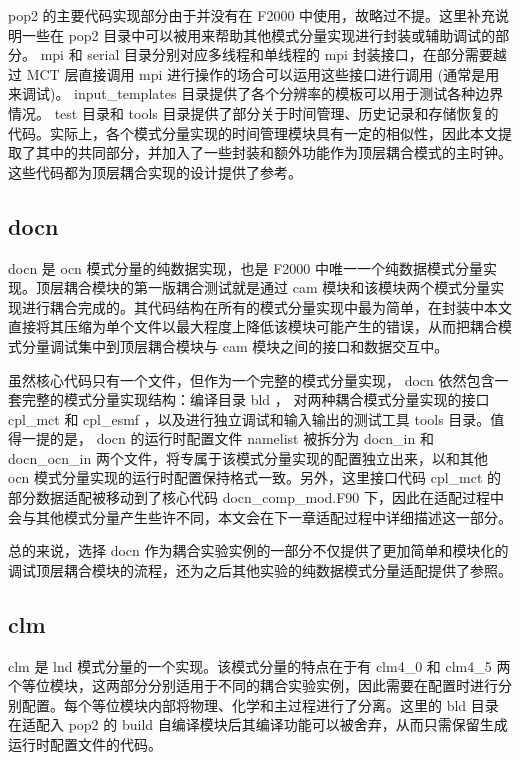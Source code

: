 pop2 的主要代码实现部分由于并没有在 F2000 中使用，故略过不提。这里补充说明一些在 pop2 目录中可以被用来帮助其他模式分量实现进行封装或辅助调试的部分。 mpi 和 serial 目录分别对应多线程和单线程的 mpi 封装接口，在部分需要越过 MCT 层直接调用 mpi 进行操作的场合可以运用这些接口进行调用 (通常是用来调试)。 input\_templates 目录提供了各个分辨率的模板可以用于测试各种边界情况。 test 目录和 tools 目录提供了部分关于时间管理、历史记录和存储恢复的代码。实际上，各个模式分量实现的时间管理模块具有一定的相似性，因此本文提取了其中的共同部分，并加入了一些封装和额外功能作为顶层耦合模式的主时钟。这些代码都为顶层耦合实现的设计提供了参考。

\subsection{docn}

docn 是 ocn 模式分量的纯数据实现，也是 F2000 中唯一一个纯数据模式分量实现。顶层耦合模块的第一版耦合测试就是通过 cam 模块和该模块两个模式分量实现进行耦合完成的。其代码结构在所有的模式分量实现中最为简单，在封装中本文直接将其压缩为单个文件以最大程度上降低该模块可能产生的错误，从而把耦合模式分量调试集中到顶层耦合模块与 cam 模块之间的接口和数据交互中。

虽然核心代码只有一个文件，但作为一个完整的模式分量实现， docn 依然包含一套完整的模式分量实现结构：编译目录 bld ， 对两种耦合模式分量实现的接口 cpl\_mct 和 cpl\_esmf ，以及进行独立调试和输入输出的测试工具 tools 目录。值得一提的是， docn 的运行时配置文件 namelist 被拆分为 docn\_in 和 docn\_ocn\_in 两个文件，将专属于该模式分量实现的配置独立出来，以和其他 ocn 模式分量实现的运行时配置保持格式一致。另外，这里接口代码 cpl\_mct 的部分数据适配被移动到了核心代码 docn\_comp\_mod.F90 下，因此在适配过程中会与其他模式分量产生些许不同，本文会在下一章适配过程中详细描述这一部分。

总的来说，选择 docn 作为耦合实验实例的一部分不仅提供了更加简单和模块化的调试顶层耦合模块的流程，还为之后其他实验的纯数据模式分量适配提供了参照。

\subsection{clm}

clm \cite{CLMdoc} \cite{CLMtech} 是 lnd 模式分量的一个实现。该模式分量的特点在于有 clm4\_0 和 clm4\_5 两个等位模块，这两部分分别适用于不同的耦合实验实例，因此需要在配置时进行分别配置。每个等位模块内部将物理、化学和主过程进行了分离。这里的 bld 目录在适配入 pop2 的 build 自编译模块后其编译功能可以被舍弃，从而只需保留生成运行时配置文件的代码。

